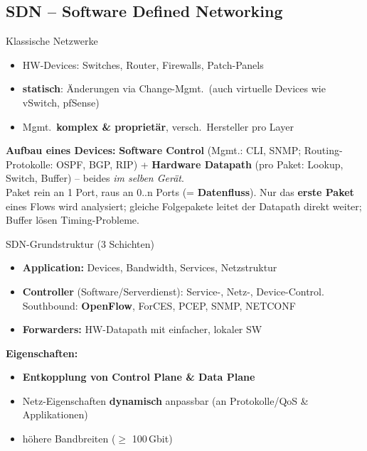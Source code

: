 \documentclass[a4paper, fontsize=7pt]{scrartcl}
\begin{document}
\subsection{SDN -- Software Defined Networking}

\begin{mainbox}{Klassische Netzwerke}
\begin{itemize}
    \item HW-Devices: Switches, Router, Firewalls, Patch-Panels
    \item \textbf{statisch}: Änderungen via Change-Mgmt.\ (auch virtuelle
          Devices wie vSwitch, pfSense)
    \item Mgmt.\ \textbf{komplex \& proprietär}, versch.\ Hersteller pro
          Layer
\end{itemize}
\textbf{Aufbau eines Devices:} \textbf{Software Control} (Mgmt.: CLI,
SNMP; Routing-Protokolle: OSPF, BGP, RIP) + \textbf{Hardware Datapath}
(pro Paket: Lookup, Switch, Buffer) -- beides \emph{im selben Gerät}.\\
Paket rein an 1 Port, raus an 0..n Ports (= \textbf{Datenfluss}). Nur das
\textbf{erste Paket} eines Flows wird analysiert; gleiche Folgepakete
leitet der Datapath direkt weiter; Buffer lösen Timing-Probleme.
\end{mainbox}

\begin{mainbox}{SDN-Grundstruktur (3 Schichten)}
\begin{itemize}
    \item \textbf{Application:} Devices, Bandwidth, Services,
          Netzstruktur
    \item \textbf{Controller} (Software/Serverdienst): Service-, Netz-,
          Device-Control. Southbound: \textbf{OpenFlow}, ForCES, PCEP,
          SNMP, NETCONF
    \item \textbf{Forwarders:} HW-Datapath mit einfacher, lokaler SW
\end{itemize}
\textbf{Eigenschaften:}
\begin{itemize}
    \item \textbf{Entkopplung von Control Plane \& Data Plane}
    \item Netz-Eigenschaften \textbf{dynamisch} anpassbar (an
          Protokolle/QoS \& Applikationen)
    \item höhere Bandbreiten ($\geq$ 100\,Gbit)
\end{itemize}
\end{mainbox}
\end{document}
